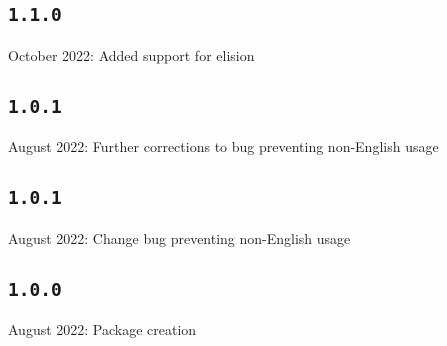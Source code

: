 \documentclass{article}
\begin{document}
\subsection*{\normalfont\texttt{1.1.0}}
 October 2022: Added support for elision


\subsection*{\normalfont\texttt{1.0.1}}



 August 2022: Further corrections to bug preventing non-English usage

\subsection*{\normalfont\texttt{1.0.1}}

 August 2022: Change bug preventing non-English usage


\subsection*{\normalfont\texttt{1.0.0}}

 August 2022: Package creation

	
\end{document}
